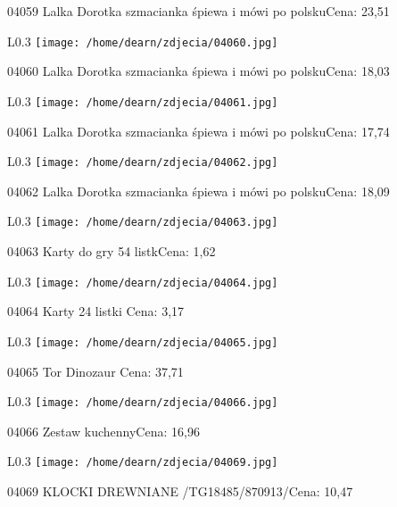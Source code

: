 04059 Lalka Dorotka szmacianka śpiewa i mówi po polskuCena: 23,51\newline
\begin{wrapfigure}{L}{0.3\textwidth}
\texttt{[image: /home/dearn/zdjecia/04060.jpg]}
\end{wrapfigure}
04060 Lalka Dorotka szmacianka śpiewa i mówi po polskuCena: 18,03\newline
\begin{wrapfigure}{L}{0.3\textwidth}
\texttt{[image: /home/dearn/zdjecia/04061.jpg]}
\end{wrapfigure}
04061 Lalka Dorotka szmacianka śpiewa i mówi po polskuCena: 17,74\newline
\begin{wrapfigure}{L}{0.3\textwidth}
\texttt{[image: /home/dearn/zdjecia/04062.jpg]}
\end{wrapfigure}
04062 Lalka Dorotka szmacianka śpiewa i mówi po polskuCena: 18,09\newline
\begin{wrapfigure}{L}{0.3\textwidth}
\texttt{[image: /home/dearn/zdjecia/04063.jpg]}
\end{wrapfigure}
04063 Karty do gry 54 listkCena: 1,62\newline
\begin{wrapfigure}{L}{0.3\textwidth}
\texttt{[image: /home/dearn/zdjecia/04064.jpg]}
\end{wrapfigure}
04064 Karty 24 listki Cena: 3,17\newline
\begin{wrapfigure}{L}{0.3\textwidth}
\texttt{[image: /home/dearn/zdjecia/04065.jpg]}
\end{wrapfigure}
04065 Tor Dinozaur Cena: 37,71\newline
\begin{wrapfigure}{L}{0.3\textwidth}
\texttt{[image: /home/dearn/zdjecia/04066.jpg]}
\end{wrapfigure}
04066 Zestaw kuchennyCena: 16,96\newline
\begin{wrapfigure}{L}{0.3\textwidth}
\texttt{[image: /home/dearn/zdjecia/04069.jpg]}
\end{wrapfigure}
04069 KLOCKI DREWNIANE /TG18485/870913/Cena: 10,47\newline
